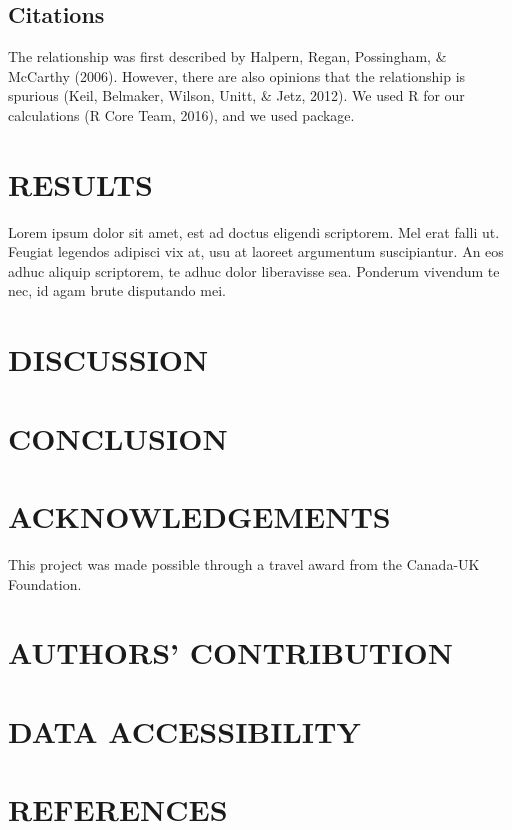 \documentclass[12pt,]{article}
\begin{document}
\subsection{Citations}\label{citations}

The relationship was first described by Halpern, Regan, Possingham, \&
McCarthy (2006). However, there are also opinions that the relationship
is spurious (Keil, Belmaker, Wilson, Unitt, \& Jetz, 2012). We used R
for our calculations (R Core Team, 2016), and we used package.

\section{RESULTS}\label{results}

Lorem ipsum dolor sit amet, est ad doctus eligendi scriptorem. Mel erat
falli ut. Feugiat legendos adipisci vix at, usu at laoreet argumentum
suscipiantur. An eos adhuc aliquip scriptorem, te adhuc dolor
liberavisse sea. Ponderum vivendum te nec, id agam brute disputando mei.

\section{DISCUSSION}\label{discussion}

\section{CONCLUSION}\label{conclusion}

\section{ACKNOWLEDGEMENTS}\label{acknowledgements}

This project was made possible through a travel award from the Canada-UK
Foundation.

\section{AUTHORS' CONTRIBUTION}\label{authors-contribution}

\section{DATA ACCESSIBILITY}\label{data-accessibility}

\section*{REFERENCES}\label{references}
\end{document}
